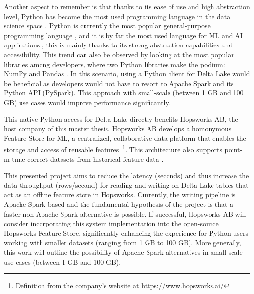 Another aspect to remember is that thanks to its ease of use and high abstraction level, Python has become the most used programming language in the data science space \cite{nagpalPythonDataAnalytics2019}. Python is currently the most popular general-purpose programming language \cite{TIOBEIndex, StackOverflowDeveloper}, and it is by far the most used language for \gls{ML} and \gls{AI} applications \cite{python-machine-learning}; this is mainly thanks to its strong abstraction capabilities and accessibility. This trend can also be observed by looking at the most popular libraries among developers, where two Python libraries make the podium: NumPy and Pandas \cite{StackOverflowDeveloper}.
In this scenario, using a Python client for Delta Lake would be beneficial as developers would not have to resort to Apache Spark and its Python \gls{API} (PySpark). This approach with small-scale (between 1 GB and 100 GB) use cases would improve performance significantly.

This native Python access for Delta Lake directly benefits Hopsworks \gls{AB}, the host company of this master thesis. Hopsworks \gls{AB} develops a homonymous Feature Store for \gls{ML}, a centralized, collaborative data platform that enables the storage and access of reusable features~\footnote{Definition from the company's website at \url{https://www.hopsworks.ai/}}. This architecture also supports point-in-time correct datasets from historical feature data \cite{Pettersson1695672}.

This presented project aims to reduce the latency (seconds) and thus increase the data throughput (rows/second) for reading and writing on Delta Lake tables that act as an offline feature store in Hopsworks. Currently, the writing pipeline is Apache Spark-based and the fundamental hypothesis of the project is that a faster non-Apache Spark alternative is possible. If successful, Hopsworks AB will consider incorporating this system implementation into the open-source Hopsworks Feature Store, significantly enhancing the experience for Python users working with smaller datasets (ranging from 1 GB to 100 GB). More generally, this work will outline the possibility of Apache Spark alternatives in small-scale use cases (between 1 GB and 100 GB).